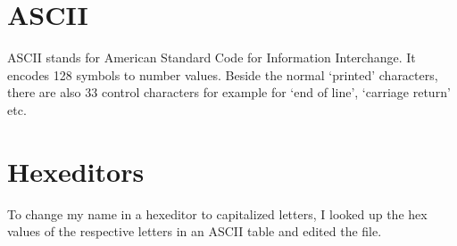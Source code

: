 \documentclass[a4paper,11pt,twoside]{article}
\begin{document}
\section{ASCII}
ASCII stands for American Standard Code for Information Interchange. It encodes 128 symbols to number values. Beside the normal `printed' characters, there are also 33 control characters for example for `end of line', `carriage return' etc.  

\section{Hexeditors}
To change my name in a hexeditor to capitalized letters, I looked up the hex values of the respective letters in an ASCII table and edited the file.


%
\end{document}
